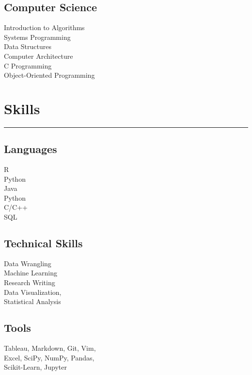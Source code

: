 \documentclass[]{sahana}
\begin{document}
\begin{minipage}[t]{0.33\textwidth}
\subsection{Computer Science}
Introduction to Algorithms\\
Systems Programming\\
Data Structures\\
Computer Architecture\\
C Programming\\
Object-Oriented Programming
\sectionsep

\section{Skills}
\noindent\rule{5cm}{0.4pt}
\subsection{Languages}
R\\
Python\\
Java \\
Python \\
C/C++\\
SQL
\vspace{6pt}
\subsection{Technical Skills}
Data Wrangling \\ Machine Learning \\ Research Writing \\ Data Visualization, \\ Statistical Analysis
\vspace{6pt}
\subsection{Tools}
Tableau, Markdown, Git, Vim,\\ Excel, SciPy, NumPy, Pandas, \\ Scikit-Learn, Jupyter
\sectionsep

%
%

\end{minipage} 
\end{document}
